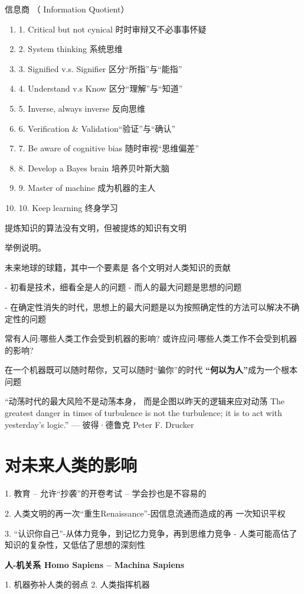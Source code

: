 信息商 （ Information Quotient）
\begin{enumerate}
\item 1. Critical but not cynical 时时审辩又不必事事怀疑
\item 2. System thinking 系统思维
\item 3. Signified v.s. Signifier 区分“所指”与“能指”
\item 4. Understand v.s Know 区分“理解”与“知道”
\item 5. Inverse, always inverse 反向思维
\item 6. Verification $\&$ Validation“验证”与“确认”
\item 7. Be aware of cognitive bias 随时审视“思维偏差”
\item 8. Develop a Bayes brain 培养贝叶斯大脑
\item 9. Master of machine 成为机器的主人
\item 10. Keep learning 终身学习
\end{enumerate}

提炼知识的算法没有文明，但被提炼的知识有文明

举例说明。 

未来地球的球籍，其中一个要素是
  各个文明对人类知识的贡献
  
- 初看是技术，细看全是人的问题 - 而人的最大问题是思想的问题

- 在确定性消失的时代，思想上的最大问题是以为按照确定性的方法可以解决不确定性的问题


常有人问:哪些人类工作会受到机器的影响? 或许应问:哪些人类工作不会受到机器的影响?

在一个机器既可以随时帮你，又可以随时“骗你”的时代 {\bf “何以为人”}成为一个根本问题

“动荡时代的最大风险不是动荡本身， 而是企图以昨天的逻辑来应对动荡
The greatest danger in times of turbulence is not the turbulence; it is to act with yesterday’s logic.”
— 彼得·德鲁克 Peter F. Drucker

 \section{对未来人类的影响}
1. 教育 – 允许“抄袭”的开卷考试 – 学会抄也是不容易的

2. 人类文明的再一次“重生Renaissance”-因信息流通而造成的再 一次知识平权

3. “认识你自己”-从体力竞争，到记忆力竞争，再到思维力竞争 - 人类可能高估了知识的复杂性，又低估了思想的深刻性


{\bf 人-机关系 Homo Sapiens – Machina Sapiens}

1. 机器弥补人类的弱点 
2. 人类指挥机器





\nocite{*}
\printbibliography[heading=bibintoc, title=\ebibname]

\newpage